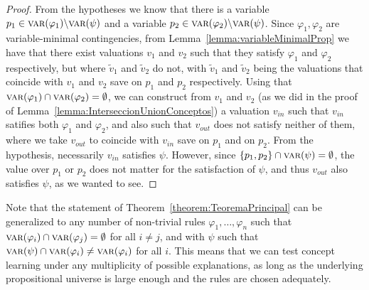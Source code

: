 \begin{appendices}
\begin{proof}

From the hypotheses we know that there is a variable $p_1 \in \textsc{var}(\varphi_1) \backslash \textsc{var}(\psi)$ and a variable $p_2 \in \textsc{var}(\varphi_2) \backslash \textsc{var}(\psi)$. 
Since $\varphi_1, \varphi_2$ are variable-minimal contingencies, from Lemma~\ref{lemma:variableMinimalProp} we have that there exist valuations $v_1$ and $v_2$ such that they satisfy $\varphi_1$ and $\varphi_2$ respectively, but where $\tilde{v}_1$ and $\tilde{v}_2$ do not, with $\tilde{v}_1$ and $\tilde{v}_2$ being the valuations that coincide with $v_1$ and $v_2$ save on $p_1$ and $p_2$ respectively. 
Using that $\textsc{var}(\varphi_1) \cap \textsc{var}(\varphi_2) = \emptyset$, we can construct from $v_1$ and $v_2$ (as we did in the proof of Lemma~\ref{lemma:InterseccionUnionConceptos}) a valuation $v_{in}$ such that $v_{in}$ satifies both $\varphi_1$ and $\varphi_2$, and also such that $v_{out}$ does not satisfy neither of them, where we take $v_{out}$ to coincide with $v_{in}$ save on $p_1$ and on $p_2$. 
From the hypothesis, necessarily $v_{in}$ satisfies $\psi$. However, since $\{p_1, p_2\} \cap \textsc{var}(\psi) = \emptyset$, the value over $p_1$ or $p_2$ does not matter for the satisfaction of $\psi$, and thus $v_{out}$ also satisfies $\psi$, as we wanted to see.
\end{proof}


Note that the statement of Theorem~\ref{theorem:TeoremaPrincipal} can be generalized to any number of non-trivial rules $\varphi_1, \dots, \varphi_n$ such that $\textsc{var}(\varphi_i) \cap \textsc{var}(\varphi_j) = \emptyset$ for all $i \neq j$, and with $\psi$ such that $\textsc{var}(\psi) \cap \textsc{var}(\varphi_i) \neq \textsc{var}(\varphi_i)$ for all $i$. 
This means that we can test concept learning under any multiplicity of possible explanations, as long as the underlying propositional universe is large enough and the rules are chosen adequately. 



\end{appendices}

